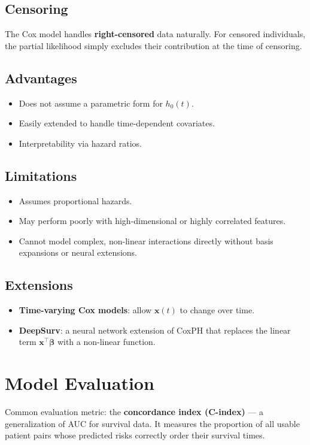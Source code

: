 \documentclass[12pt]{article}
\begin{document}
\subsection{Censoring}

The Cox model handles \textbf{right-censored} data naturally. For censored individuals, the partial likelihood simply excludes their contribution at the time of censoring.

\subsection{Advantages}

\begin{itemize}
  \item Does not assume a parametric form for $h_0(t)$.
  \item Easily extended to handle time-dependent covariates.
  \item Interpretability via hazard ratios.
\end{itemize}

\subsection{Limitations}

\begin{itemize}
  \item Assumes proportional hazards.
  \item May perform poorly with high-dimensional or highly correlated features.
  \item Cannot model complex, non-linear interactions directly without basis expansions or neural extensions.
\end{itemize}

\subsection{Extensions}

\begin{itemize}
  \item \textbf{Time-varying Cox models}: allow $\mathbf{x}(t)$ to change over time.
  \item \textbf{DeepSurv}: a neural network extension of CoxPH that replaces the linear term $\mathbf{x}^\top \boldsymbol{\beta}$ with a non-linear function.
\end{itemize}
\section{Model Evaluation}
Common evaluation metric: the \textbf{concordance index (C-index)} — a generalization of AUC for survival data. It measures the proportion of all usable patient pairs whose predicted risks correctly order their survival times.
\end{document}

